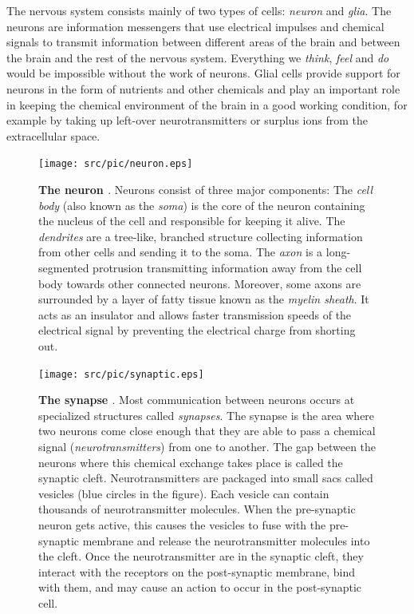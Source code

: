 The nervous system consists mainly of two types of cells: \emph{neuron} and \emph{glia}. The neurons are information messengers that use electrical impulses and chemical signals to transmit information between different areas of the brain and between the brain and the rest of the nervous system. Everything we \emph{think}, \emph{feel} and \emph{do} would be impossible without the work of neurons. Glial cells provide support for neurons in the form of nutrients and other chemicals and play an important role in keeping the chemical environment of the brain in a good working condition, for example by taking up left-over neurotransmitters or surplus ions from the extracellular space.

\begin{figure}[t!]
  \centering
  \texttt{[image: src/pic/neuron.eps]}
  \caption{\textbf{The neuron \cite[taken from][]{introductiontopsychology}}. Neurons consist of three major components: The \emph{cell body} (also known as the \emph{soma}) is the core of the neuron containing the nucleus of the cell and responsible for keeping it alive. The \emph{dendrites} are a tree-like, branched structure collecting information from other cells and sending it to the soma. The \emph{axon} is a long-segmented protrusion transmitting information away from the cell body towards other connected neurons. Moreover, some axons are surrounded by a layer of fatty tissue known as the \emph{myelin sheath}. It acts as an insulator and allows faster transmission speeds of the electrical signal by preventing the electrical charge from shorting out.}
  \label{fig:neuron}
\end{figure}

\begin{figure}[t!]
  \centering
  \texttt{[image: src/pic/synaptic.eps]}
  \caption{\textbf{The synapse \citep[taken from][]{introductiontopsychology}}. Most communication between neurons occurs at specialized structures called \emph{synapses}. The synapse is the area where two neurons come close enough that they are able to pass a chemical signal (\emph{neurotransmitters}) from one to another. The gap between the neurons where this chemical exchange takes place is called the synaptic cleft. Neurotransmitters are packaged into small sacs called vesicles (blue circles in the figure). Each vesicle can contain thousands of neurotransmitter molecules. When the pre-synaptic neuron gets active, this causes the vesicles to fuse with the pre-synaptic membrane and release the neurotransmitter molecules into the cleft. Once the neurotransmitter are in the synaptic cleft, they interact with the receptors on the post-synaptic membrane, bind with them, and may cause an action to occur in the post-synaptic cell.}
  \label{fig:synapse}
\end{figure}

